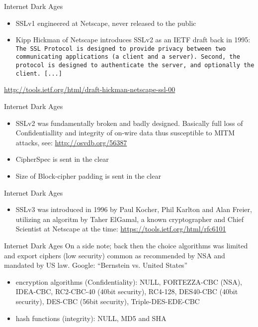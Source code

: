 
\begin{frame}{Internet Dark Ages}

  \begin{itemize}
    \item SSLv1 engineered at Netscape, never released to the public
    \item Kipp Hickman of Netscape introduces SSLv2 as an IETF draft back in 1995:
      \newline
      \newline
      \texttt{The SSL Protocol is designed to provide privacy between two communicating applications (a client and a server). Second, the protocol is designed to authenticate the server, and optionally the client. [...]}
  \end{itemize}
  \vspace{50px}

  \tiny\url{http://tools.ietf.org/html/draft-hickman-netscape-ssl-00}

\end{frame}

\begin{frame}{Internet Dark Ages}
  \begin{itemize}
    \item SSLv2 was fundamentally broken and badly designed. Basically full loss of Confidentiallity and integrity of on-wire data thus susceptible to MITM attacks, see: \url{http://osvdb.org/56387}
    \item CipherSpec is sent in the clear
    \item Size of Block-cipher padding is sent in the clear
  \end{itemize}
\end{frame}

\begin{frame}{Internet Dark Ages}
  \begin{itemize}
    \item SSLv3 was introduced in 1996 by Paul Kocher, Phil Karlton and Alan Freier, utilizing an algoritm by Taher ElGamal, a known cryptographer and Chief Scientist at Netscape at the time: \url{https://tools.ietf.org/html/rfc6101}
  \end{itemize}
\end{frame}

\begin{frame}{Internet Dark Ages}
  On a side note; back then the choice algorithms was limited and export ciphers (low security) common as recommended by NSA and mandated by US law. Google: ``Bernstein vs. United States''
  \begin{itemize}
    \item encryption algorithms (Confidentiality): NULL, FORTEZZA-CBC (NSA), IDEA-CBC, RC2-CBC-40 (40bit security), RC4-128, DES40-CBC (40bit security), DES-CBC (56bit security), Triple-DES-EDE-CBC
    \item hash functions (integrity): NULL, MD5 and SHA
  \end{itemize}
\end{frame}

